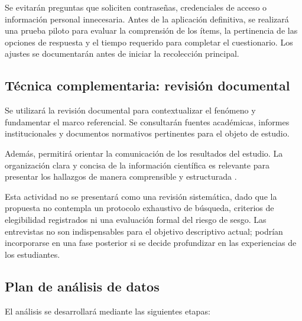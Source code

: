 Se evitarán preguntas que soliciten contraseñas, credenciales de acceso o información personal innecesaria. Antes de la aplicación definitiva, se realizará una prueba piloto para evaluar la comprensión de los ítems, la pertinencia de las opciones de respuesta y el tiempo requerido para completar el cuestionario. Los ajustes se documentarán antes de iniciar la recolección principal.

\subsection{Técnica complementaria: revisión documental}

Se utilizará la revisión documental para contextualizar el fenómeno y fundamentar el marco referencial. Se consultarán fuentes académicas, informes institucionales y documentos normativos pertinentes para el objeto de estudio.

Además, permitirá orientar la comunicación
de los resultados del estudio. La organización clara y concisa de la información científica es relevante para presentar los hallazgos de manera comprensible y estructurada
\parencite{osmarueda2012resumen}.

Esta actividad no se presentará como una revisión sistemática, dado que la propuesta no contempla un protocolo exhaustivo de búsqueda, criterios de elegibilidad registrados ni una evaluación formal del riesgo de sesgo. Las entrevistas no son indispensables para el objetivo descriptivo actual; podrían incorporarse en una fase posterior si se decide profundizar en las experiencias de los estudiantes.



\subsection{Plan de análisis de datos}

El análisis se desarrollará mediante las siguientes etapas:

